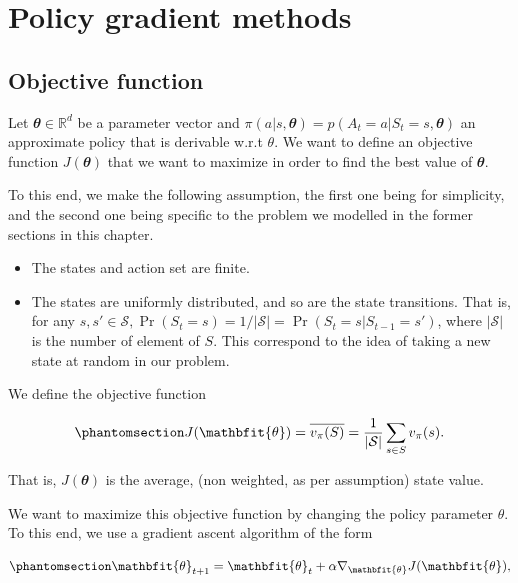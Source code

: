 \documentclass[
  letterpaper,
]{report}
\providecommand{\tightlist}{%
  \setlength{\itemsep}{0pt}\setlength{\parskip}{0pt}}\usepackage{longtable,booktabs,array}
\theoremstyle{definition}
\theoremstyle{plain}
\theoremstyle{definition}
\theoremstyle{remark}
\begin{document}
\section{Policy gradient methods}\label{policy-gradient-methods}

\subsection{Objective function}\label{objective-function}

Let \(\mathbfit{\theta} \in \mathbb{R}^d\) be a parameter vector and
\(\pi(a|s,\mathbfit{\theta}) = p(A_t = a | S_t = s , \mathbfit{\theta})\)
an approximate policy that is derivable w.r.t \(\theta\). We want to
define an objective function \(J(\mathbfit{\theta})\) that we want to
maximize in order to find the best value of \(\mathbfit{\theta}\).

To this end, we make the following assumption, the first one being for
simplicity, and the second one being specific to the problem we modelled
in the former sections in this chapter.

\begin{itemize}
\tightlist
\item
  The states and action set are finite.
\item
  The states are uniformly distributed, and so are the state
  transitions. That is, for any
  \(s,s'\in\mathcal{S}, \Pr(S_t = s) = 1 / |\mathcal{S}| = \Pr(S_t = s | S_{t-1} = s')\),
  where \(|\mathcal{S}|\) is the number of element of \(S\). This
  correspond to the idea of taking a new state at random in our problem.
\end{itemize}

We define the objective function

\begin{equation}\phantomsection\label{eq-objective_function}{
J(\mathbfit{\theta}) = \overline{v_\pi(S)} = \frac{1}{|\mathcal{S}|}\sum_{s\in S}v_\pi(s).
}\end{equation}

That is, \(J(\mathbfit{\theta})\) is the average, (non weighted, as per
assumption) state value.

We want to maximize this objective function by changing the policy
parameter \(\theta\). To this end, we use a gradient ascent algorithm of
the form

\begin{equation}\phantomsection\label{eq-gradient_ascent_algorithm}{
\mathbfit{\theta}_{t+1} = {\mathbfit{\theta}}_t + \alpha \nabla_{\mathbfit{\theta}} J(\mathbfit{\theta}),
}\end{equation}
\end{document}
